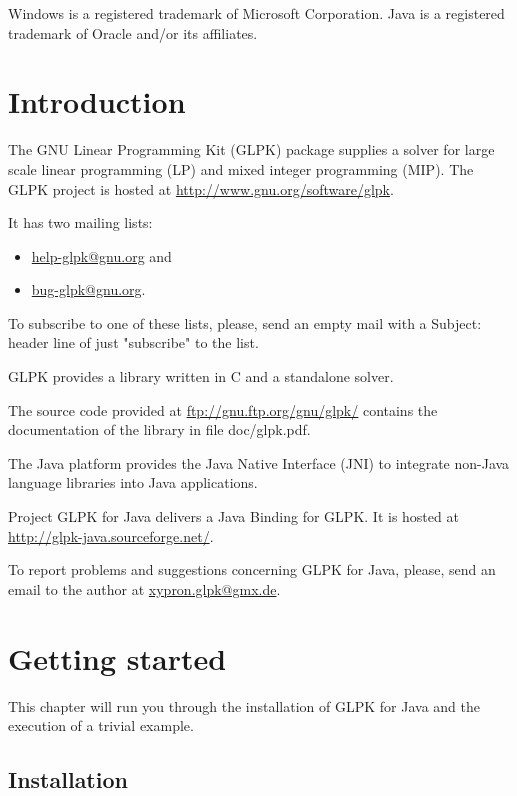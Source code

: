 \documentclass[a4paper,11pt]{report}
\begin{document}
\medskip \noindent
Windows is a registered trademark of Microsoft Corporation. 
Java is a registered trademark of Oracle and/or its affiliates.

\tableofcontents

\chapter{Introduction}
The GNU Linear Programming Kit (GLPK)\cite{GLPK} package supplies a solver for
large scale linear programming (LP) and mixed integer programming (MIP). The
GLPK project is hosted at
\linebreak\href{http://www.gnu.org/software/glpk}{http://www.gnu.org/software/glpk}.

It has two mailing lists:
\begin{itemize}
\item\href{mailto:help-glpk@gnu.org}{help-glpk@gnu.org} and 
\item\href{mailto:bug-glpk@gnu.org}{bug-glpk@gnu.org}.
\end{itemize}
To subscribe to one of these lists, please, send an empty mail with a Subject: header line of just "subscribe" to the list.

GLPK provides a library written in C and a standalone solver.

The source code provided at \href{ftp://gnu.ftp.org/gnu/glpk/}{ftp://gnu.ftp.org/gnu/glpk/} contains the documentation of the library in  file doc/glpk.pdf.

The Java platform provides the Java Native Interface (JNI)\cite{JNI} to integrate non-Java language libraries into Java applications.

Project GLPK for Java delivers a Java Binding for GLPK. It is hosted at \linebreak\href{http://glpk-java.sourceforge.net/}{http://glpk-java.sourceforge.net/}.

To report problems and suggestions concerning GLPK for Java, please, send an email to the author at \href{mailto:xypron.glpk@gmx.de}{xypron.glpk@gmx.de}.

\chapter{Getting started}

This chapter will run you through the installation of GLPK for Java and the execution of a trivial example.

\section{Installation}
\end{document}
